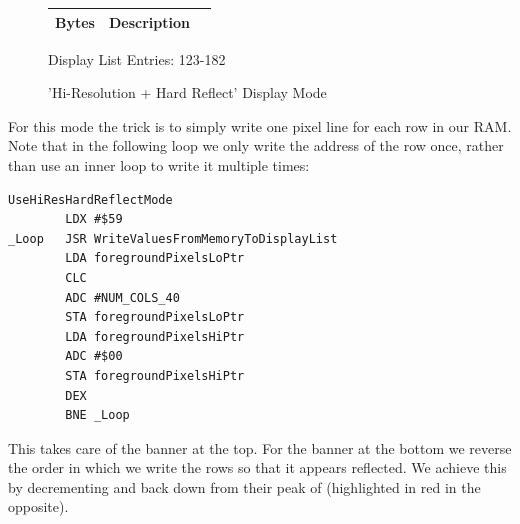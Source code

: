 \begin{minipage}[b]{0.31\linewidth}
  \begin{figure}[H]
    {
      \setlength{\tabcolsep}{3.0pt}
      \setlength\cmidrulewidth{\heavyrulewidth} %
      \begin{adjustbox}{height=8.5cm}

        \begin{tabular}{lll}
          \toprule
          Bytes       & Description                                                         \\
          \midrule
        \end{tabular}

      \end{adjustbox}

    }\caption*{Display List Entries: 123-182}
  \end{figure}
\end{minipage}

\clearpage
\begin{figure}[H]
    \centering
    \begin{adjustbox}{width=12cm,center}
    \end{adjustbox}
\caption{'Hi-Resolution + Hard Reflect' Display Mode}
\end{figure}

For this mode the trick is to simply write one pixel line for each row in our RAM. Note that in the following
loop we only write the address of the row once, rather than use an inner loop to write it multiple times:
\begin{lstlisting}
UseHiResHardReflectMode   
        LDX #$59
_Loop   JSR WriteValuesFromMemoryToDisplayList
        LDA foregroundPixelsLoPtr
        CLC 
        ADC #NUM_COLS_40
        STA foregroundPixelsLoPtr
        LDA foregroundPixelsHiPtr
        ADC #$00
        STA foregroundPixelsHiPtr
        DEX 
        BNE _Loop
\end{lstlisting}
This takes care of the banner at the top. For the banner at the bottom we reverse the order in which we write
the rows so that it appears reflected. We achieve this by decrementing  and
 back down from their peak of  (highlighted in red in the  opposite).


